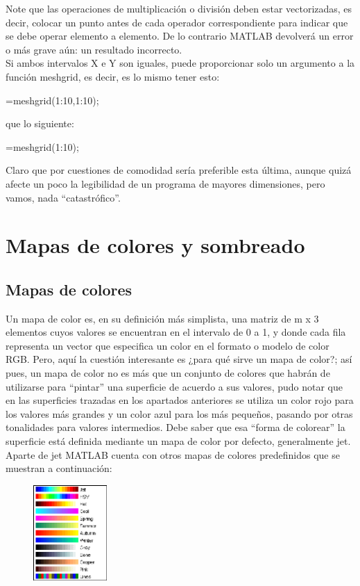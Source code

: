 Note que las operaciones de multiplicación o división deben estar
vectorizadas, es decir, colocar un punto antes de cada operador
correspondiente para indicar que se debe operar elemento a elemento. De
lo contrario MATLAB devolverá un error o más grave aún: un resultado
incorrecto. \\

Si ambos intervalos X e Y son iguales, puede proporcionar solo un
argumento a la función meshgrid, es decir, es lo mismo tener esto:

\begin{matlab}
[X,Y]=meshgrid(1:10,1:10);
\end{matlab}

que lo siguiente:

\begin{matlab}
[X,Y]=meshgrid(1:10);
\end{matlab}

Claro que por cuestiones de comodidad sería preferible esta última,
aunque quizá afecte un poco la legibilidad de un programa de mayores
dimensiones, pero vamos, nada ``catastrófico''.

\section{Mapas de colores y sombreado}

\subsection{Mapas de colores}

Un mapa de color es, en su definición más simplista, una matriz de m x 3
elementos cuyos valores se encuentran en el intervalo de 0 a 1, y donde
cada fila representa un vector que especifica un color en el formato o
modelo de color RGB. Pero, aquí la cuestión interesante es ¿para qué
sirve un mapa de color?; así pues, un mapa de color no es más que un
conjunto de colores que habrán de utilizarse para ``pintar'' una
superficie de acuerdo a sus valores, pudo notar que en las superficies
trazadas en los apartados anteriores se utiliza un color rojo para los
valores más grandes y un color azul para los más pequeños, pasando por
otras tonalidades para valores intermedios. Debe saber que esa ``forma
de colorear'' la superficie está definida mediante un mapa de color por
defecto, generalmente jet. Aparte de jet MATLAB cuenta con otros mapas
de colores predefinidos que se muestran a continuación:

\begin{figure}[htbp]
\centering
\includegraphics[width=0.25\textwidth]{images/ch4/img_4_9.png}
\caption{}
\end{figure}

